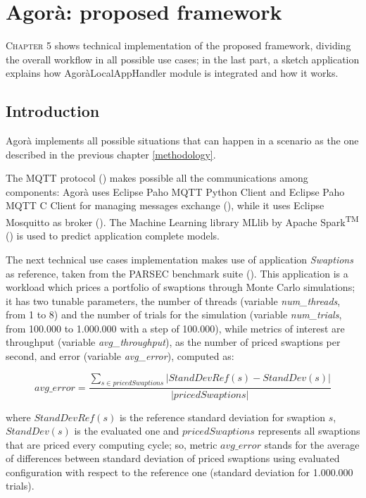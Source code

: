 \chapter{Agorà: proposed framework}\label{agora}

\lettrine{C}{hapter} 5 shows technical implementation of the proposed framework, dividing the overall workflow in all possible use cases; in the last part, a sketch application explains how AgoràLocalAppHandler module is integrated and how it works.


\section{Introduction}

Agorà implements all possible situations that can happen in a scenario as the one described in the previous chapter \ref{methodology}.

The MQTT protocol (\cite{banks2014mqtt}) makes possible all the communications among components: Agorà uses Eclipse Paho MQTT Python Client and Eclipse Paho MQTT C Client for managing messages exchange (\cite{o2014paho}), while it uses Eclipse Mos\-quitto as broker (\cite{light2013mosquitto}). The Machine Learning library MLlib by Apache Spark\textsuperscript{TM} (\cite{spark2015apache}) is used to predict application complete models.

The next technical use cases implementation makes use of application \textit{Swaptions} as reference, taken from the PARSEC benchmark suite (\cite{bienia2008parsec}). This application is a workload which prices a portfolio of swaptions through Monte Carlo simulations; it has two tunable parameters, the number of threads (variable \textit{num\_threads}, from 1 to 8) and the number of trials for the simulation (variable \textit{num\_trials}, from 100.000 to 1.000.000 with a step of 100.000), while metrics of interest are throughput (variable \textit{avg\_throughput}), as the number of priced swaptions per second, and error (variable \textit{avg\_error}), computed as:

\[
avg\_error = \dfrac{\sum_{s \in pricedSwaptions} \left\vert StandDevRef(s) - StandDev(s) \right\vert}{\left\vert pricedSwaptions \right\vert}
\]

where $StandDevRef(s)$ is the reference standard deviation for swaption $s$, $StandDev(s)$ is the evaluated one and $pricedSwaptions$ represents all swaptions that are priced every computing cycle; so, metric $avg\_error$ stands for the average of differences between standard deviation of priced swaptions using evaluated configuration with respect to the reference one (standard deviation for 1.000.000 trials).

